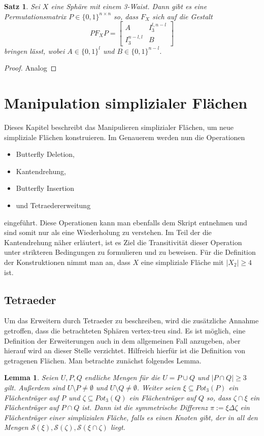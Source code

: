 \documentclass[12pt,titlepage,twoside,cleardoublepage]{article}
\theoremstyle{nummermitklammern}
\newtheorem{lemma}[temp]{Lemma}
\newtheorem{satz}[temp]{Satz}
\newtheorem{lemma}[zahl]{Lemma}
\newtheorem{satz}[zahl]{Satz}
\numberwithin{equation}{section}
\begin{document}
\begin{satz}
Sei $X$ eine Sphäre mit einem 3-Waist. Dann gibt es eine Permutationsmatrix $P\in \{0,1\}^{n \times n}$ so, dass $F_X$ sich auf die Gestalt 
\[
PF_XP=
\left[ 
\begin{array}{c|c} 
  A & I^{l,n-l}_3 \\ 
  \hline 
  I^{n-l,l}_3 & B 
\end{array} 
\right]
\] 
bringen lässt, wobei $A\in \{0,1\}^{l}$ und $B\in \{0,1\}^{n-l}$.
\end{satz}
\begin{proof}

Analog
\end{proof}
\section{Manipulation simplizialer Flächen}
Dieses Kapitel beschreibt das Manipulieren simplizialer Flächen, um neue simpliziale Flächen konstruieren. Im Genauerem werden nun die Operationen
\begin{itemize}
\item Butterfly Deletion,
\item Kantendrehung,
 \item Butterfly Insertion
 \item und Tetraedererweitung
\end{itemize} 
 eingeführt.
Diese Operationen kann man ebenfalls dem Skript entnehmen und sind somit nur als eine Wiederholung zu verstehen. Im Teil der die Kantendrehung näher erläutert, ist es Ziel die Transitivität dieser Operation unter strikteren Bedingungen zu formulieren und zu beweisen.
Für die Definition der Konstruktionen nimmt man an, dass $X$ eine simpliziale Fläche mit $\vert X_2 \vert \geq 4$ ist.

  \subsection{Tetraeder}
 Um das Erweitern durch Tetraeder zu beschreiben, wird die zusätzliche Annahme getroffen, dass die betrachteten Sphären vertex-treu sind. Es ist möglich, eine Definition der Erweiterungen auch in dem allgemeinen Fall anzugeben, aber hierauf wird an dieser Stelle verzichtet.
 Hilfreich hierfür ist die Definition von getragenen Flächen. Man betrachte zunächst folgendes Lemma.
\begin{lemma}
Seien $U,P,Q$ endliche Mengen für die $U=P\cup Q$ und $\vert P\cap Q \vert \geq 3$ gilt. Außerdem sind $U\setminus P\neq \emptyset$ und $U\setminus Q \neq \emptyset$. Weiter seien $\xi \subseteq Pot_3(P)$ ein Flächenträger auf P und $\zeta \subseteq Pot_3(Q)$ ein Flächenträger auf $Q$ so, dass $\zeta \cap \xi$ ein Flächenträger auf $P \cap Q$ ist. Dann ist die symmetrische Differenz $\pi :=\xi \Delta \zeta$ ein Flächenträger einer simplizialen Fläche, falls es einen Knoten gibt, der in all den Mengen $\mathcal{S}(\xi),\mathcal{S}(\zeta),\mathcal{S}(\xi\cap\zeta)$ liegt. 
\end{lemma}
\end{document}
